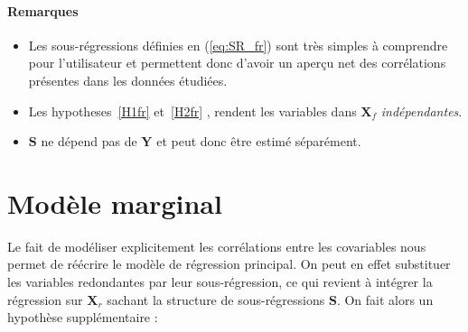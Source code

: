 \documentclass[12pt,a4paper]{report}
\begin{document}
	\paragraph{Remarques}
\begin{itemize}
\item Les sous-régressions définies en (\ref{eq:SR_fr}) sont très simples à comprendre pour l'utilisateur et permettent donc d'avoir un aperçu net des corrélations présentes dans les données étudiées.
\item Les hypotheses~\ref{H1fr} et~\ref{H2fr} , rendent les variables dans $\boldsymbol{X}_f$ {\it indépendantes}.
\item $\boldsymbol{S}$ ne dépend pas de $\boldsymbol{Y}$ et peut donc être estimé séparément.
\end{itemize} 
	\section{Modèle marginal}
	Le fait de modéliser explicitement les corrélations entre les covariables nous permet de réécrire le modèle de régression principal. On peut en effet substituer les variables redondantes par leur sous-régression, ce qui revient à intégrer la régression sur $\boldsymbol{X}_{r}$ sachant la structure de sous-régressions $\boldsymbol{S}$. On fait alors un hypothèse supplémentaire :
\end{document}
